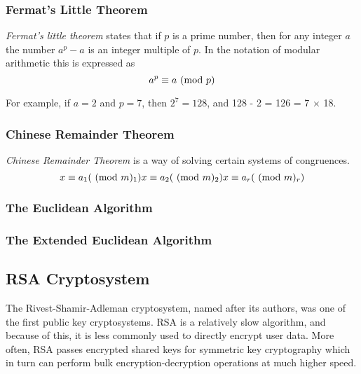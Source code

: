 \subsubsection{Fermat's Little Theorem}
\begin{definition}
    \textit{Fermat's little theorem} states that if $p$ is a prime number,
    then for any integer $a$ the number $a^p - a$ is an integer multiple of $p$.
    In the notation of modular arithmetic this is expressed as
    $$ a^p \equiv a \ (\mathrm{mod}\ p) $$
\end{definition}
For example, if $a = 2$ and $p = 7$, then $2^7 = 128$, and 128 - 2 = 126 = 7 $\times$ 18.

\subsubsection{Chinese Remainder Theorem}
\begin{definition}
    \textit{Chinese Remainder Theorem} is a way of solving certain systems of congruences.
    $$
    x \equiv a_1 (\ (\mathrm{mod}\ m)_1) \\
    x \equiv a_2 (\ (\mathrm{mod}\ m)_2) \\
    x \equiv a_r (\ (\mathrm{mod}\ m)_r)
    $$
\end{definition}

\subsubsection{The Euclidean Algorithm}

\subsubsection{The Extended Euclidean Algorithm}

\subsection{RSA Cryptosystem}
The Rivest-Shamir-Adleman cryptosystem,
named after its authors, was one of the first public key cryptosystems.
RSA is a relatively slow algorithm, and because of this,
it is less commonly used to directly encrypt user data.
More often, RSA passes encrypted shared keys for symmetric key cryptography
which in turn can perform bulk encryption-decryption operations at much higher speed.

